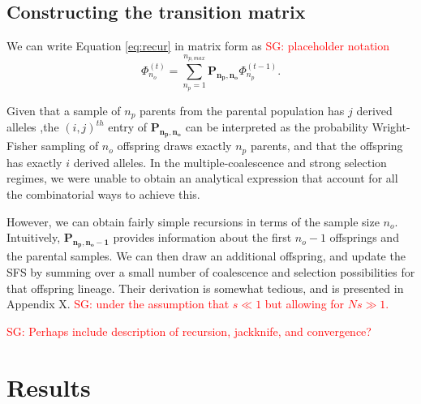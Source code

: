 \documentclass[review]{elsarticle}
\newcommand{\afs}[2]{\Phi_{#1}^{(#2)}}
\newcommand{\sgcomment}[1]{\textcolor{red}{SG: #1}}
\begin{document}
\subsection{Constructing the transition matrix}

We can write Equation \eqref{eq:recur} in matrix form as \sgcomment{placeholder notation}
 \begin{equation}
\label{eq:recur}
 \afs{n_o}{t} = \sum_{n_p=1}^{n_{p,max}} \mathbf{P_{n_p,n_o}} \afs{n_p}{t-1}.
\end{equation}

Given that a sample of $n_p$ parents from the parental population has $j$ derived alleles ,the $(i, j)^{th}$ entry of $\mathbf{P_{n_p,n_o}} $ can be interpreted as the probability Wright-Fisher sampling of $n_o$ offspring draws exactly $n_p$ parents, and that the offspring has exactly $i$ derived alleles. 
In the multiple-coalescence and strong selection regimes, we were unable to obtain an analytical expression
 that account for all the combinatorial ways to achieve this. 
 
 However, we can obtain fairly simple recursions in terms of the sample size $n_o.$ 
 Intuitively,  $\mathbf{P_{n_p,n_o-1}}$ provides information about the first $n_o-1$ 
 offsprings and the parental samples. 
 We can then draw an additional offspring, and update the SFS by summing over a 
 small number of coalescence and selection possibilities for that offspring lineage.  
 Their derivation is somewhat tedious, and is presented in Appendix X. 
 \sgcomment{under the assumption that $s\ll1$ but allowing for $Ns \gg 1.$}
 
  \sgcomment{Perhaps include description of recursion, jackknife, and convergence?}
 \section{Results}
\label{sec:results}
 
 
\end{document}
